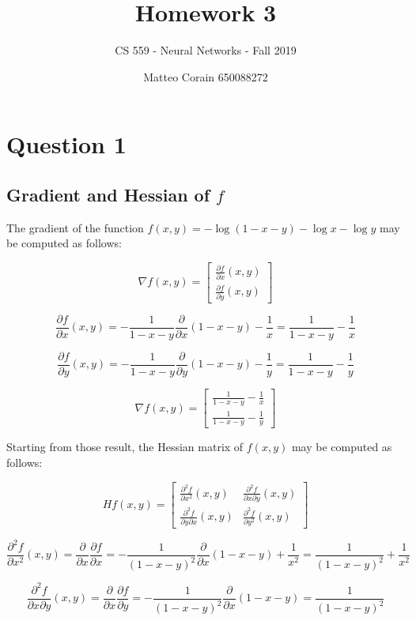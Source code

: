 \documentclass[letterpaper,headings=standardclasses]{scrartcl}
\title{Homework 3}
\subtitle{CS 559 - Neural Networks - Fall 2019}
\author{Matteo Corain 650088272}
\begin{document}
\maketitle

\section{Question 1}

\subsection{Gradient and Hessian of $f$}

The gradient of the function $f(x,y) = -\log{(1-x-y)} -\log{x} - \log{y}$ may be computed as follows:

$$ \nabla f(x,y) = \left[ \begin{matrix} \frac{\partial f}{\partial x}(x,y) \\[0.5em] \frac{\partial f}{\partial y}(x,y) \end{matrix} \right] $$

$$ \frac{\partial f}{\partial x}(x,y) = -\frac{1}{1-x-y} \frac{\partial}{\partial x}(1-x-y) -\frac{1}{x} = \frac{1}{1-x-y} -\frac{1}{x} $$

$$ \frac{\partial f}{\partial y}(x,y) = -\frac{1}{1-x-y} \frac{\partial}{\partial y}(1-x-y) -\frac{1}{y} = \frac{1}{1-x-y} -\frac{1}{y} $$

$$ \nabla f(x,y) = \left[ \begin{matrix} \frac{1}{1-x-y} -\frac{1}{x} \\[0.5em] \frac{1}{1-x-y} -\frac{1}{y} \end{matrix} \right] $$

Starting from those result, the Hessian matrix of $f(x,y)$ may be computed as follows:

$$ Hf(x,y) = \left[ \begin{matrix} \frac{\partial^2 f}{\partial x^2}(x,y) & \frac{\partial^2 f}{\partial x \partial y}(x,y) \\[0.5em] \frac{\partial^2 f}{\partial y \partial x}(x,y) & \frac{\partial^2 f}{\partial y^2}(x,y) \end{matrix} \right] $$

$$ \frac{\partial^2 f}{\partial x^2}(x,y) = \frac{\partial}{\partial x} \frac{\partial f}{\partial x} = - \frac{1}{(1-x-y)^2} \frac{\partial}{\partial x}(1-x-y) + \frac{1}{x^2} = \frac{1}{(1-x-y)^2} + \frac{1}{x^2} $$

$$ \frac{\partial^2 f}{\partial x \partial y}(x,y) = \frac{\partial}{\partial x} \frac{\partial f}{\partial y} = - \frac{1}{(1-x-y)^2} \frac{\partial}{\partial x}(1-x-y) = \frac{1}{(1-x-y)^2} $$
\end{document}

